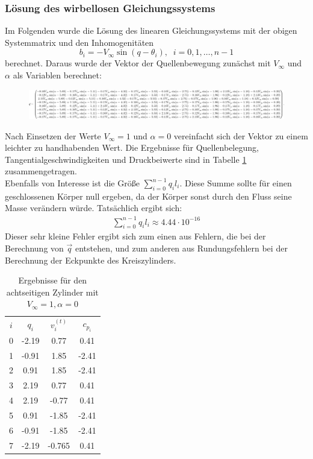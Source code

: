 \subsubsection{Lösung des wirbellosen Gleichungssystems}
Im Folgenden wurde die Lösung des linearen Gleichungssystems mit der obigen Systemmatrix und den Inhomogenitäten
\begin{equation}
b_i =  -V_{\infty} \sin{(q-\theta _i)}, \;\; i= 0,1,\ldots, n-1
\end{equation}
berechnet. Daraus wurde der Vektor der Quellenbewegung zunächst mit $V_{\infty}$ und $\alpha $ als Variablen berechnet: \\
\begin{figure}[!h]
\begin{center}
\includegraphics[scale=0.2]{figures/analytical.png} 
\label{fig:analyticalcylinder8}
\end{center}
\end{figure}

Nach Einsetzen der Werte $V_{\infty} = 1$ und $\alpha  = 0$ vereinfacht sich der Vektor zu einem leichter zu handhabenden Wert. Die Ergebnisse für Quellenbelegung, Tangentialgeschwindigkeiten und Druckbeiwerte sind in Tabelle \ref{tab:cyl8} zusammengetragen. \\
Ebenfalls von Interesse ist die Größe $\sum_{i=0}^{n-1} q_i l_i$. Diese Summe sollte für einen geschlossenen Körper null ergeben, da der Körper sonst durch den Fluss seine Masse verändern würde. Tatsächlich ergibt sich:
\begin{align*}
\sum_{i=0}^{n-1} q_i l_i \approx 4.44 \cdot 10^{-16}
\end{align*}
Dieser sehr kleine Fehler ergibt sich zum einen aus Fehlern, die bei der Berechnung von $\vec q$ entstehen, und zum anderen aus Rundungsfehlern bei der Berechnung der Eckpunkte des Kreiszylinders.

\begin{table}
\caption{Ergebnisse für den achtseitigen Zylinder mit $V_{\infty} = 1, \alpha  = 0$}
\label{tab:cyl8}
\begin{center}
\begin{tabular}{c|ccc}
$i$ & $q_i$ & $v_i^{(t)}$ & $c_{p_i}$ \\
0 & -2.19 & 0.77 & 0.41 \\
1 & -0.91 & 1.85 & -2.41 \\
2 & 0.91 & 1.85 & -2.41 \\
3 & 2.19 & 0.77 & 0.41 \\
4 & 2.19 & -0.77 &  0.41 \\ 
5 &  0.91 & -1.85 & -2.41 \\
6 & -0.91 & -1.85 & -2.41 \\
7 & -2.19 &-0.765 & 0.41
\end{tabular}
\end{center}
\end{table}

